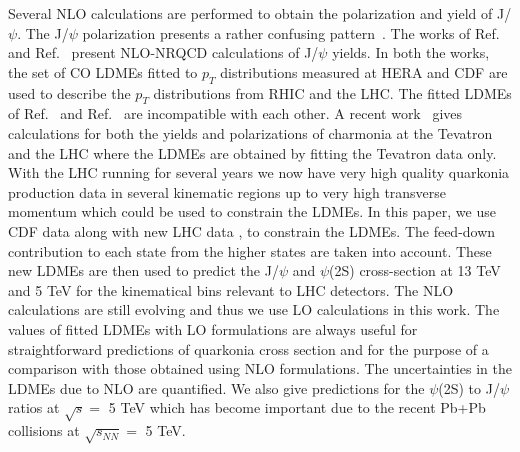 \documentclass[aps,prc,preprint,superscriptaddress,showpacs,showkeys,amsmath]{revtex4-1}
\begin{document}
  Several NLO calculations are performed to obtain the polarization and yield of
J/$\psi$. The J/$\psi$ polarization presents a rather confusing 
pattern~\cite{Butenschoen:2012px,Chao:2012iv,Gong:2012ug}.
  The works of Ref.~\cite{Butenschoen:2010rq} and  Ref.~\cite{Ma:2010jj} present
NLO-NRQCD calculations of J/$\psi$ yields.
  In both the works, the set of CO LDMEs fitted to $p_{T}$ distributions measured 
at HERA and CDF are used to describe the $p_{T}$ distributions from RHIC and 
the LHC.
 The fitted LDMEs of Ref.~\cite{Butenschoen:2010rq} and  Ref.~\cite{Ma:2010jj}
are incompatible with each other. A recent work~\cite{Shao:2014yta} gives 
calculations for both the yields and polarizations of charmonia at the Tevatron 
and the LHC where the LDMEs are obtained by fitting the Tevatron data only.
  With the LHC running for several years we now have very high quality quarkonia 
production data in several kinematic regions up to very high transverse momentum 
which could be used to constrain the LDMEs. In this paper, we use CDF data
\cite{Abe:1997yz,Abe:1997jz,Acosta:2004yw,Abulencia:2007bra} along with new LHC data 
\cite{Chatrchyan:2011kc,Khachatryan:2015rra,Chatrchyan:2012ub,Aad:2015duc,ATLAS:2014ala},
\cite{Aaij:2012ag,Aaij:2011jh,Aaij:2015rla,Aaij:2013dja} to constrain 
the LDMEs. 
 The feed-down contribution to each state from the higher states are taken into account.
These new LDMEs are then used to predict the J/$\psi$ and $\psi$(2S)
cross-section at 13 TeV and 5 TeV for the kinematical bins relevant to LHC detectors.
 The NLO calculations are still evolving and thus we use LO calculations in 
this work. The values of fitted LDMEs with LO formulations are always useful 
for straightforward predictions of quarkonia cross section and for the 
purpose of a comparison with those obtained using NLO formulations.
 The uncertainties in the LDMEs due to NLO are quantified. We also give predictions
for the $\psi$(2S) to J/$\psi$ ratios at $\sqrt{s}=$ 5 TeV which has 
become important due to the recent Pb+Pb collisions at $\sqrt{s_{NN}}=$ 5 TeV. 
\end{document}
